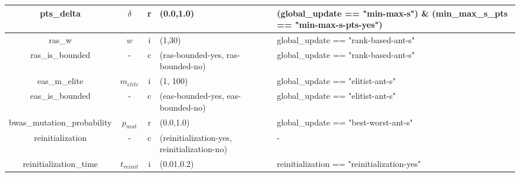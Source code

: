 \documentclass[12pt,a4paper,oneside]{book}
\begin{document}
\begin{table}[]
\begin{tabular}{|c|c|c|p{4cm}|p{4cm}|}
pts\_delta                      & $\delta$   & r    & (0.0,1.0)                                                                      & (global\_update == "min-max-s") \& (min\_max\_s\_pts == "min-max-s-pts-yes")                  \\ \hline
ras\_w                          & $w$        & i    & (1,30)                                                                         & global\_update == "rank-based-ant-s"                                                          \\ \hline
ras\_is\_bounded                & -          & c    & (ras-bounded-yes, ras-bounded-no)                                               & global\_update == "rank-based-ant-s"                                                          \\ \hline
eas\_m\_elite                   & $m_{elite}$ & i   & (1, 100)                                                                       & global\_update == "elitist-ant-s"                                                             \\ \hline
eas\_is\_bounded                & -          & c    & (eas-bounded-yes, eas-bounded-no)                                               & global\_update == "elitist-ant-s"                                                             \\ \hline
bwas\_mutation\_probability     & $p_{mut}$    & r    & (0.0,1.0)                                                                      & global\_update == "best-worst-ant-s"                                                          \\ \hline
reinitialization                & -          & c    & (reinitialization-yes, reinitialization-no)                                     & -                                                                                             \\ \hline
reinitialization\_time          & $t_{reinit}$ & i    & (0.01,0.2)                                                                     & reinitialization == "reinitialization-yes"                                                    \\ \hline
\end{tabular}
\end{table}
\end{document}
